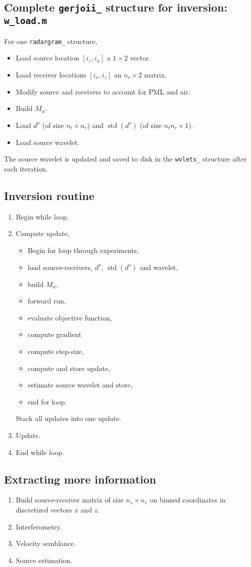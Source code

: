 \documentclass[a4paper,12pt]{article}
\begin{document}
\subsection*{Complete \texttt{gerjoii\_} structure for inversion: \texttt{w\_load.m}}
For one \texttt{radargram\_} structure,
\begin{itemize}
\item Load source location $[i_z, i_x]$ a $1\times 2$ vector.
\item Load receiver locations $[i_x, i_z]$ an $n_r\times 2$ matrix.
\item Modify source and receivers to account for PML and air.
\item Build $M_w$.
\item Load $d^o$ (of size $n_t\times n_r$) and $\operatorname{std}(d^o)$ (of size $n_t n_r\times 1$).
\item Load source wavelet.
\end{itemize}
The source wavelet is updated and saved to disk in the \texttt{wvlets\_} structure after each iteration.
%
\subsection*{Inversion routine}
\begin{enumerate}
\item Begin while loop.
\item Compute update,
\begin{itemize}
\item Begin for loop through experiments,
\item load source-receivers, $d^o$, $\operatorname{std}(d^o)$ and wavelet,
\item build $M_w$,
\item forward run,
\item evaluate objective function,
\item compute gradient
\item compute step-size,
\item compute and store update,
\item estimate source wavelet and store,
\item end for loop.
\end{itemize}
Stack all updates into one update.
\item Update.
\item End while loop.
\end{enumerate}
%
\subsection*{Extracting more information}
\begin{enumerate}
\item Build source-receiver matrix of size $n_s\times n_r$ on binned coordinates in discretized vectors $x$ and $z$.
\item Interferometry.
\item Velocity semblance.
\item Source estimation. 
\end{enumerate}
%
%
%


\end{document}
